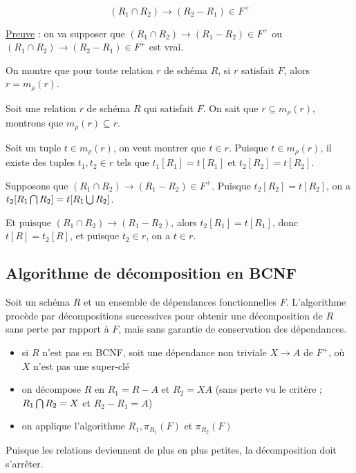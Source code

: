 			$$(R_1 \cap R_2) \rightarrow (R_2 - R_1) \in F^+$$
			
			\underline{Preuve} : on va supposer que $(R_1 \cap R_2) \rightarrow (R_1 - R_2) \in F^+$ ou $(R_1 \cap R_2) \rightarrow (R_2 - R_1) \in F^+$ est vrai.
			
			On montre que pour toute relation $r$ de schéma $R$, si $r$ satisfait $F$, alors $r = m_{\rho}(r)$.
			
			Soit une relation $r$ de schéma $R$ qui satisfait $F$. On sait que $r \subseteq m_{\rho}(r)$, montrons que $m_{\rho}(r) \subseteq r$.
			
			Soit un tuple $t \in m_{\rho}(r)$, on veut montrer que $t \in r$. Puisque $t \in m_{\rho}(r)$, il existe des tuples $t_1, t_2 \in r$ tels que $t_1[R_1] = t[R_1]$ et $t_2[R_2] = t[R_2]$.
			
			Supposons que $(R_1 \cap R_2) \rightarrow (R_1 - R_2) \in F^+$. Puisque $t_2[R_2] = t[R_2]$, on a $t_2[R_1 \bigcap R_2] = t[R_1 \bigcup R_2]$. 
			
			Et puisque $(R_1 \cap R_2) \rightarrow (R_1 - R_2)$, alors $t_2[R_1] = t[R_1]$, donc $t[R] = t_2[R]$, et puisque $t_2 \in r$, on a $t \in r$.
			
			
	
		\subsection{Algorithme de décomposition en BCNF}
		
		Soit un schéma $R$ et un ensemble de dépendances fonctionnelles $F$. L'algorithme procède par décompositions successives pour obtenir une décomposition de $R$ sans perte par rapport à $F$, mais sans garantie de conservation des dépendances.
		
		
		\begin{itemize}
			\item si $R$ n'est pas en BCNF, soit une dépendance non triviale $X \rightarrow A$ de $F^+$, où $X$ n'est pas une super-clé
			\item on décompose $R$ en $R_1 = R - A$ et $R_2 = XA$ (sans perte vu le critère ; $R_1 \bigcap R_2 = X$ et $R_2 - R_1 = A$)
			\item on applique l'algorithme $R_1, \pi_{R_1}(F)$ et $\pi_{R_2}(F)$
		\end{itemize}
			
		Puisque les relations deviennent de plus en plus petites, la décomposition doit s'arrêter.
			

